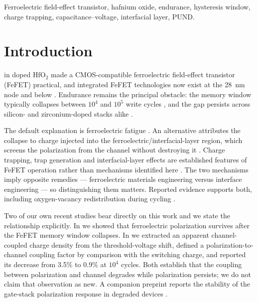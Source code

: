 \documentclass[journal]{IEEEtran}
\newcommand{\rev}[1]{{\color{blue}#1}}      %
\begin{document}
\begin{IEEEkeywords}
Ferroelectric field-effect transistor, hafnium oxide, endurance,
hysteresis window, charge trapping, capacitance--voltage, interfacial
layer, PUND.
\end{IEEEkeywords}

\section{Introduction}
 in doped HfO$_2$ \cite{Fe1,Fe2} made a
CMOS-compatible ferroelectric field-effect transistor (FeFET) practical,
and integrated FeFET technologies now exist at the \SI{28}{\nano\meter}
node and below \cite{Khan2020,QLC_FeNAND}. Endurance remains the
principal obstacle: the memory window typically collapses between $10^4$
and $10^5$ write cycles \cite{Mulaosmanovic_2021,HKG_FeFET,HfO_SCM},
and the gap persists across silicon- and zirconium-doped stacks alike
\cite{endurance1,Device_life}.

The default explanation is ferroelectric fatigue \cite{fatigue}. An
alternative attributes the collapse to charge injected into the
ferroelectric/interfacial-layer region, which screens the polarization
from the channel without destroying it
\cite{Ref_DD_1,Charge_Trap_endurance,Toprasertpong,passlack}.
\rev{Charge trapping, trap generation and interfacial-layer effects are
established features of FeFET operation rather than mechanisms
identified here \cite{Tasneem,Trapping_dynamics,Defect_dynamics}.} The
two mechanisms imply opposite remedies --- ferroelectric materials
engineering \cite{Stability} versus interface engineering
\cite{endurance3,endurance4,AgnivaTSA} --- so distinguishing them
matters. Reported evidence supports both, including oxygen-vacancy
redistribution during cycling \cite{Oxygen_Vac,ref_1_OV,Ref_2OV}.

\rev{Two of our own recent studies bear directly on this work and we
state the relationship explicitly. In \cite{ACSAMI} we showed that
ferroelectric polarization survives after the FeFET memory window
collapses. In \cite{ACSAELM} we extracted an apparent channel-coupled
charge density from the threshold-voltage shift, defined a
polarization-to-channel coupling factor by comparison with the switching
charge, and reported its decrease from 3.5\% to 0.9\% at $10^4$ cycles.
Both establish that the coupling between polarization and channel
degrades while polarization persists; we do not claim that observation
as new. A companion preprint reports the stability of the gate-stack
polarization response in degraded devices \cite{preprint}.}
\end{document}
